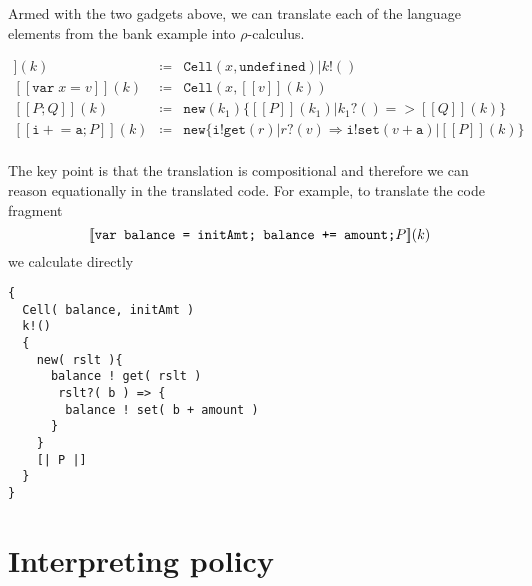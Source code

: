 \documentclass[]{amsart}
\newcommand{\ldb}{[\![}
\newcommand{\rdb}{]\!]}
\newcommand{\id}[1]{\texttt{#1}}
\newcommand{\juxtap}{\mathbin{\id{|}}}
\newcommand{\binpar}[2]{#1 \juxtap #2}
\newcommand{\meaningof}[1]{\ldb #1 \rdb}
\newcommand{\defneqls}{\coloneqq}
\theoremstyle{definition}
\theoremstyle{remark}
\numberwithin{equation}{subsection}
\newcommand{\rhoc}{$\rho$-calculus}
\begin{document}

Armed with the two gadgets above, we can translate each of the language elements from the bank example into \rhoc.

\begin{eqnarray*}
 \meaningof{\texttt{var}\; x}( k ) & \defneqls & \binpar{\texttt{Cell}( x, \texttt{undefined} )}{k!()} \\
 \meaningof{\texttt{var}\; x = v}( k ) & \defneqls & \texttt{Cell}( x, \meaningof{ v }( k ) ) \\
 \meaningof{ P ; Q }( k ) & \defneqls & \texttt{new}(k_1)\{ \binpar{\meaningof{ P }( k_1 )}{ k_1?() => \meaningof{ Q }( k )} \} \\
 \meaningof{ \texttt{i} +\!= \texttt{a} ; P }( k ) & \defneqls & \texttt{new} \{ \binpar{\binpar{\texttt{i} ! \texttt{get}( r )}{r?( v ) \Rightarrow \texttt{i}! \texttt{set}( v + \texttt{a} ) }}{\meaningof{P}( k )} \}\\
\end{eqnarray*}



The key point is that the translation is compositional and therefore
we can reason equationally in the translated code. For example, to
translate the code fragment 
\[\meaningof{ \mbox{\tt var balance = initAmt; balance += amount;} P }( k )\]
we calculate directly


\begin{verbatim}
{ 
  Cell( balance, initAmt ) 
  k!() 
  {
    new( rslt ){
      balance ! get( rslt )  
       rslt?( b ) => {
        balance ! set( b + amount )
      }
    } 
    [| P |] 
  }
}
\end{verbatim}


\section{Interpreting policy}
\end{document}
